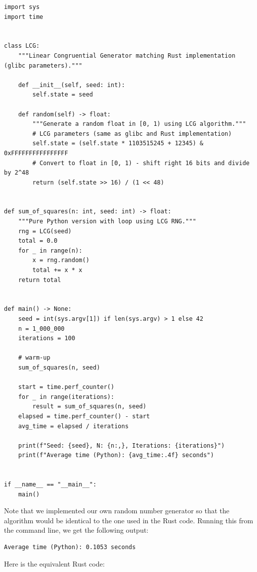 \begin{lstlisting}[style=Python]
import sys
import time


class LCG:
    """Linear Congruential Generator matching Rust implementation (glibc parameters)."""
    
    def __init__(self, seed: int):
        self.state = seed
        
    def random(self) -> float:
        """Generate a random float in [0, 1) using LCG algorithm."""
        # LCG parameters (same as glibc and Rust implementation)
        self.state = (self.state * 1103515245 + 12345) & 0xFFFFFFFFFFFFFFFF
        # Convert to float in [0, 1) - shift right 16 bits and divide by 2^48
        return (self.state >> 16) / (1 << 48)


def sum_of_squares(n: int, seed: int) -> float:
    """Pure Python version with loop using LCG RNG."""
    rng = LCG(seed)
    total = 0.0
    for _ in range(n):
        x = rng.random()
        total += x * x
    return total


def main() -> None:
    seed = int(sys.argv[1]) if len(sys.argv) > 1 else 42
    n = 1_000_000
    iterations = 100

    # warm-up
    sum_of_squares(n, seed)
    
    start = time.perf_counter()
    for _ in range(iterations):
        result = sum_of_squares(n, seed)
    elapsed = time.perf_counter() - start
    avg_time = elapsed / iterations

    print(f"Seed: {seed}, N: {n:,}, Iterations: {iterations}")
    print(f"Average time (Python): {avg_time:.4f} seconds")


if __name__ == "__main__":
    main()
\end{lstlisting}

Note that we implemented our own random number generator so that the algorithm would be identical to the one used in the Rust code. Running this from the command line, we get the following output:

\begin{lstlisting}[style=shellshort]
Average time (Python): 0.1053 seconds
\end{lstlisting}

Here is the equivalent Rust code:

